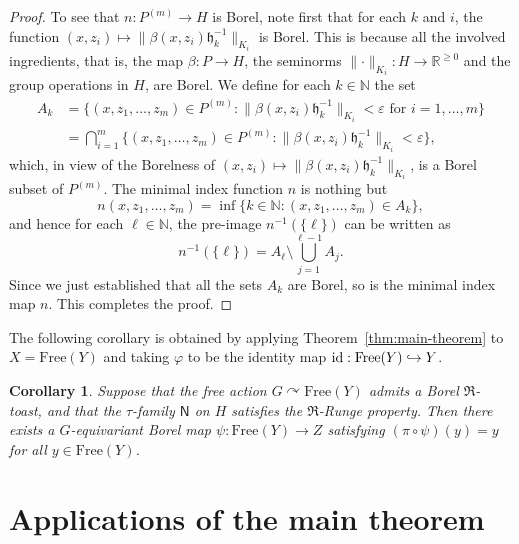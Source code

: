\documentclass[12pt]{paper}
\numberwithin{equation}{section}
\theoremstyle{plain}
\newtheorem{corollary}[theorem]{Corollary}
\theoremstyle{definition}
\newcommand{\N}{\mathbb{N}}
\newcommand{\R}{\mathbb{R}}
\newcommand{\mfR}{\mathfrak{R}}
\newcommand{\unifn}{\mathsf{N}}
\newcommand{\acts}{\curvearrowright}
\newcommand{\free}{\mathrm{Free}}
\renewcommand{\epsilon}{\varepsilon}
\renewcommand{\phi}{\varphi}
\begin{document}
\begin{proof}
  To see that \(n:P^{(m)}\to H\) is Borel, note first that for each \(k\) and \(i\), the function
  \((x,z_i)\mapsto \lVert \beta(x,z_i){\mathfrak h}_k^{-1}\rVert_{K_i}\)
  is Borel.  This is because
  all the involved ingredients, that is, the map \(\beta:P\to H\), the seminorms
  \(\lVert \cdot\rVert_{K_i}: H\to \R^{\ge 0}\) and the group operations in \(H\), are Borel. We
  define for each \(k\in\N\) the set
  \[
    \begin{aligned}
      A_k&=\big\{(x,z_1,\ldots,z_m)\in P^{(m)}:
           \lVert \beta(x,z_i){\mathfrak h}_k^{-1}\rVert_{K_i}<\epsilon \text{ for }i=1,\ldots,m\big\}\\
         &=\bigcap_{i=1}^m \big\{(x,z_1,\ldots,z_m)\in P^{(m)}:
           \lVert \beta(x,z_i){\mathfrak h}_k^{-1}\rVert_{K_i}<\epsilon\big\},
    \end{aligned}
  \]
  which, in view of the Borelness of
  \((x,z_i)\mapsto \lVert \beta(x,z_i){\mathfrak h}_k^{-1}\rVert_{K_i}\), is a Borel subset of
  \(P^{(m)}\). The minimal index function \(n\) is nothing but
  \[
    n(x,z_1,\ldots,z_m)=\inf\big\{k\in \N: (x,z_1,\ldots,z_m)\in A_k\big\},
  \]
  and hence for each \(\ell\in\N\), the pre-image \(n^{-1}(\{\ell\})\) can be written as
  \[
    n^{-1}(\{\ell\})=A_\ell\setminus \bigcup_{j=1}^{\ell-1} A_j.
  \]
  Since we just established that all the sets \(A_k\) are Borel, so is the minimal index map
  \(n\). This completes the proof.
\end{proof}

The following corollary is obtained by applying Theorem~\ref{thm:main-theorem} to \(X = \free(Y)\)
and taking \(\phi\) to be the identity map \({\rm id} : \free(Y) \hookrightarrow Y\).

\begin{corollary}
  \label{cor:main-corollary}
  Suppose that the free action \(G \acts \free(Y)\) admits a Borel \(\mfR\)-toast, and that the
  \(\tau\)-family \(\unifn\) on \(H\) satisfies the \(\mfR\)-Runge property.  Then there exists a
  \(G\)-equivariant Borel map \(\psi : \free(Y) \to Z\) satisfying \((\pi \circ \psi)(y) = y\) for
  all \(y \in \free(Y)\).
\end{corollary}














\section{Applications of the main theorem}
\label{sec:appl-main-theor}
\end{document}
